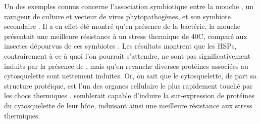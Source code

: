 

Un des exemples connus concerne l'association symbiotique entre la mouche , un ravageur de culture et vecteur de virus phytopathogènes, et son symbiote secondaire .
Il a en effet été montré qu'en présence de la bactérie, la mouche présentait une meilleure résistance à un stress thermique de 40\textdegree{}C, comparé aux insectes dépourvus de ces symbiotes \cite{brumin2011}.
Les résultats montrent que les HSPs, contrairement à ce à quoi l'on pourrait s'attendre, ne sont pas significativement induits par la présence de , mais qu'en revanche diverses protéines associées au cytosquelette sont nettement induites.
Or, on sait que le cytosquelette, de part sa structure protéique, est l'un des organes cellulaire le plus rapidement touché par les chocs thermiques \cite{brumin2011}.
 semblerait capable d'induire la sur-expression de protéines du cytosquelette de leur hôte, induisant ainsi une meilleure résistance aux stress thermiques.

